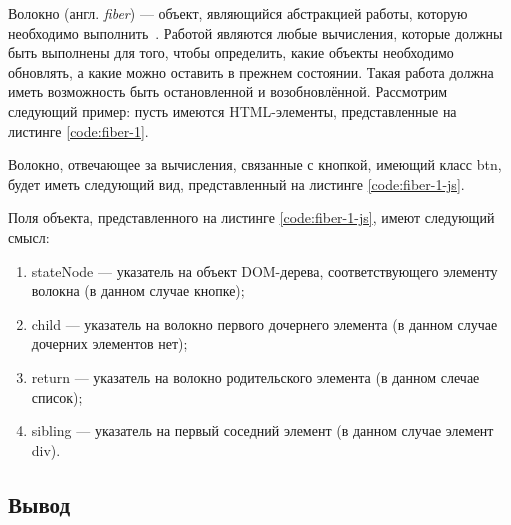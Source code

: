 Волокно (англ. \textit{fiber}) --- объект, являющийся абстракцией работы, которую необходимо выполнить~\cite{react-dive}. Работой являются любые вычисления, которые должны быть выполнены для того, чтобы определить, какие объекты необходимо обновлять, а какие можно оставить в прежнем состоянии. Такая работа должна иметь возможность быть остановленной и возобновлённой. Рассмотрим следующий пример: пусть имеются HTML-элементы, представленные на листинге \ref{code:fiber-1}.


Волокно, отвечающее за вычисления, связанные с кнопкой, имеющий класс btn, будет иметь следующий вид, представленный на листинге \ref{code:fiber-1-js}.


Поля объекта, представленного на листинге \ref{code:fiber-1-js}, имеют следующий смысл:
\begin{enumerate}[label=\arabic*)]
	\item stateNode --- указатель на объект DOM-дерева, соответствующего элементу волокна (в данном случае кнопке);
	\item child --- указатель на волокно первого дочернего элемента (в данном случае дочерних элементов нет);
	\item return --- указатель на волокно родительского элемента (в данном слечае список);
	\item sibling --- указатель на первый соседний элемент (в данном случае элемент div).
\end{enumerate}


\subsection*{Вывод}


